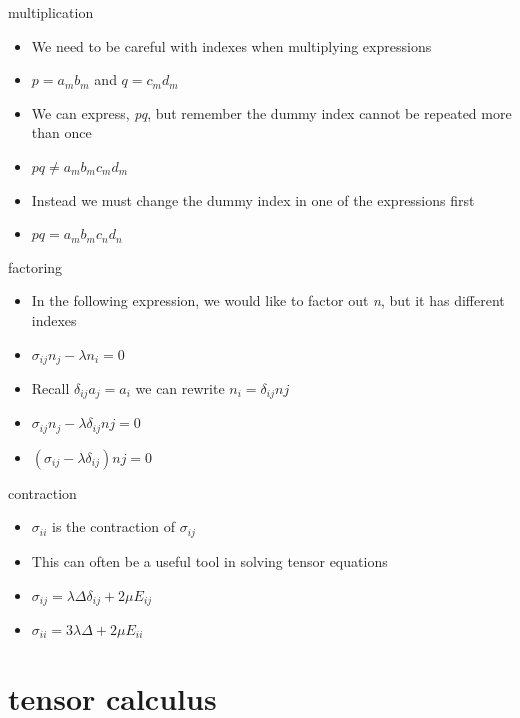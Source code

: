 \documentclass[
  letterpaper,
  ignorenonframetext,
  aspectratio=43,
  handout,
  12pt]{beamer}
\providecommand{\tightlist}{%
  \setlength{\itemsep}{0pt}\setlength{\parskip}{0pt}}
\providecommand{\tightlist}{%
\setlength{\itemsep}{0pt}\setlength{\parskip}{0pt}}
\begin{document}
\begin{frame}{multiplication}
\protect\hypertarget{multiplication}{}
\begin{itemize}
\tightlist
\item
  We need to be careful with indexes when multiplying expressions
\item
  \(p = a_m b_m\) and \(q = c_m d_m\)
\item
  We can express, \emph{pq}, but remember the dummy index cannot be
  repeated more than once
\item
  \(pq \ne a_m b_m c_m d_m\)\\
\item
  Instead we must change the dummy index in one of the expressions first
\item
  \(pq = a_m b_m c_n d_n\)
\end{itemize}
\end{frame}

\begin{frame}{factoring}
\protect\hypertarget{factoring}{}
\begin{itemize}
\tightlist
\item
  In the following expression, we would like to factor out \emph{n}, but
  it has different indexes
\item
  \(\sigma_{ij}n_j - \lambda n_i = 0\)
\item
  Recall \(\delta_{ij}a_j = a_i\) we can rewrite
  \(n_i = \delta_{ij}{nj}\)
\item
  \(\sigma_{ij}n_j - \lambda \delta_{ij}{nj} = 0\)
\item
  \((\sigma_{ij} - \lambda \delta_{ij}){nj} = 0\)
\end{itemize}
\end{frame}

\begin{frame}{contraction}
\protect\hypertarget{contraction}{}
\begin{itemize}
\tightlist
\item
  \(\sigma_{ii}\) is the contraction of \(\sigma_{ij}\)
\item
  This can often be a useful tool in solving tensor equations
\item
  \(\sigma_{ij} = \lambda \Delta \delta_{ij} + 2\mu E_{ij}\)
\item
  \(\sigma_{ii} = 3\lambda \Delta + 2\mu E_{ii}\)
\end{itemize}
\end{frame}

\hypertarget{tensor-calculus}{%
\section{tensor calculus}\label{tensor-calculus}}
\end{document}
